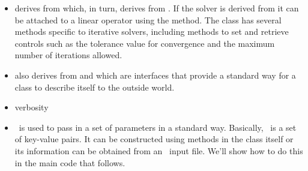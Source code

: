 \begin{itemize}
    \item {} derives from 
  which, in turn, derives from .  If the
  solver is derived from   it can be attached
  to a linear operator using the  method.  The
   class has several methods specific to
  iterative solvers, including methods to set and retrieve controls
  such as the tolerance value for convergence and the maximum number
  of iterations allowed.
    \item {} also derives from 
  and  which are interfaces that provide a standard
  way for a class to describe itself to the outside world.
    \item verbosity
    \item \paramList\ is used to pass in a set of parameters in a
  standard way.  Basically, \paramList\ is a set of key-value pairs.
  It can be constructed using methods in the class itself or its
  information can be obtained from an \xml\ input file.  We'll show
  how to do this in the main code that follows.
\end{itemize}
